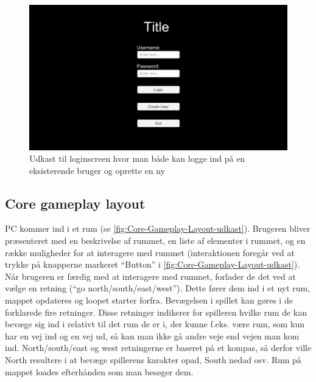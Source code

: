 \begin{figure}[H]
\centering
\includegraphics[width = \textwidth]{02-Body/Images/Loginscreen-udkast.png}
\caption{Udkast til loginscreen hvor man både kan logge ind på en eksisterende bruger og oprette en ny}
\label{fig:Loginscreen-udkast}
\end{figure}

\subsection{Core gameplay layout}
PC kommer ind i et rum (se \autoref{fig:Core-Gameplay-Layout-udkast}). Brugeren bliver præsenteret med en beskrivelse af rummet, en liste af elementer i rummet, og en række muligheder for at interagere med rummet (interaktionen foregår ved at trykke på knapperne markeret “Button” i \autoref{fig:Core-Gameplay-Layout-udkast}). Når brugeren er færdig med at interagere med rummet, forlader de det ved at vælge en retning (“go north/south/east/west”). 
Dette fører dem ind i et nyt rum, mappet opdateres og loopet starter forfra.
Bevægelsen i spillet kan gøres i de forklarede fire retninger. Disse retninger indikerer for spilleren hvilke rum de kan bevæge sig ind i relativt til det rum de er i, der kunne f.eks. være rum, som kun har en vej ind og en vej ud, så kan man ikke gå andre veje end vejen man kom ind. North/south/east og west retningerne er baseret på et kompas, så derfor ville North resultere i at bevæge spillerens karakter opad, South nedad osv.
Rum på mappet loades efterhånden som man besøger dem.

